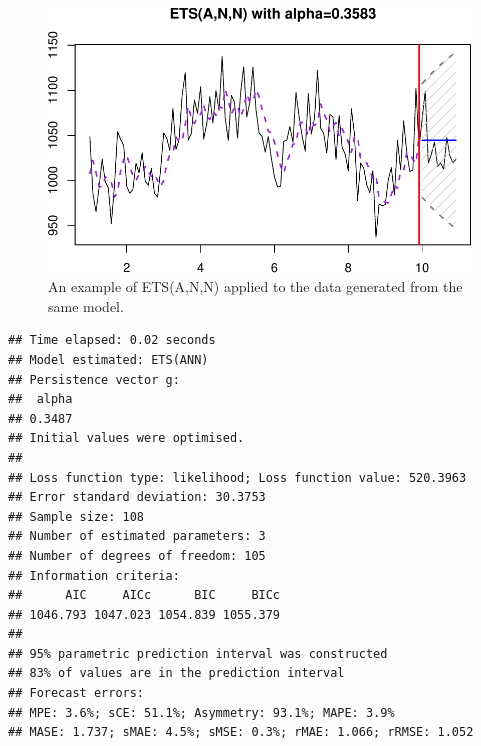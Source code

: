 \documentclass[
]{book}
\newenvironment{Shaded}{\begin{snugshade}}{\end{snugshade}}
\newcommand{\AttributeTok}[1]{\textcolor[rgb]{0.77,0.63,0.00}{#1}}
\newcommand{\CommentTok}[1]{\textcolor[rgb]{0.56,0.35,0.01}{\textit{#1}}}
\newcommand{\ConstantTok}[1]{\textcolor[rgb]{0.00,0.00,0.00}{#1}}
\newcommand{\DecValTok}[1]{\textcolor[rgb]{0.00,0.00,0.81}{#1}}
\newcommand{\FloatTok}[1]{\textcolor[rgb]{0.00,0.00,0.81}{#1}}
\newcommand{\FunctionTok}[1]{\textcolor[rgb]{0.00,0.00,0.00}{#1}}
\newcommand{\NormalTok}[1]{#1}
\newcommand{\OtherTok}[1]{\textcolor[rgb]{0.56,0.35,0.01}{#1}}
\newcommand{\SpecialCharTok}[1]{\textcolor[rgb]{0.00,0.00,0.00}{#1}}
\newcommand{\StringTok}[1]{\textcolor[rgb]{0.31,0.60,0.02}{#1}}
\theoremstyle{definition}
\theoremstyle{definition}
\theoremstyle{definition}
\theoremstyle{definition}
\theoremstyle{remark}
\begin{document}
\begin{Shaded}
\end{Shaded}

\begin{figure}
\centering
\includegraphics{Svetunkov--2022----ADAM_files/figure-latex/ETSANNExample-1.pdf}
\caption{\label{fig:ETSANNExample}An example of ETS(A,N,N) applied to the data generated from the same model.}
\end{figure}

\begin{verbatim}
## Time elapsed: 0.02 seconds
## Model estimated: ETS(ANN)
## Persistence vector g:
##  alpha 
## 0.3487 
## Initial values were optimised.
## 
## Loss function type: likelihood; Loss function value: 520.3963
## Error standard deviation: 30.3753
## Sample size: 108
## Number of estimated parameters: 3
## Number of degrees of freedom: 105
## Information criteria:
##      AIC     AICc      BIC     BICc 
## 1046.793 1047.023 1054.839 1055.379 
## 
## 95% parametric prediction interval was constructed
## 83% of values are in the prediction interval
## Forecast errors:
## MPE: 3.6%; sCE: 51.1%; Asymmetry: 93.1%; MAPE: 3.9%
## MASE: 1.737; sMAE: 4.5%; sMSE: 0.3%; rMAE: 1.066; rRMSE: 1.052
\end{verbatim}
\end{document}
